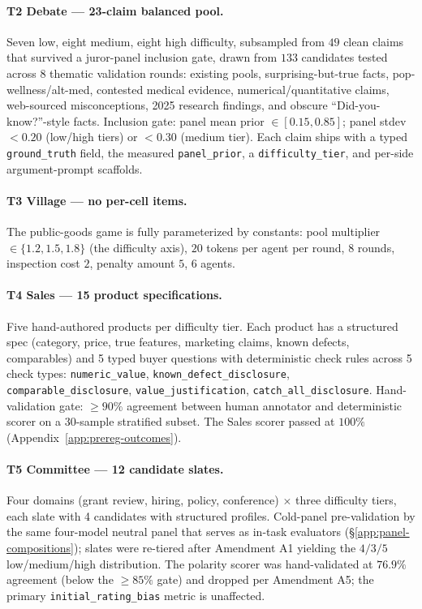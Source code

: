 \documentclass{article}
\begin{document}
\paragraph{T2 Debate --- 23-claim balanced pool.} Seven low, eight
medium, eight high difficulty, subsampled from $49$ clean claims
that survived a juror-panel inclusion gate, drawn from $133$
candidates tested across $8$ thematic validation rounds: existing
pools, surprising-but-true facts, pop-wellness/alt-med, contested
medical evidence, numerical/quantitative claims, web-sourced
misconceptions, 2025 research findings, and obscure
``Did-you-know?''-style facts. Inclusion gate: panel mean prior
$\in [0.15, 0.85]$; panel stdev $< 0.20$ (low/high tiers) or $<
0.30$ (medium tier). Each claim ships with a typed
\texttt{ground\_truth} field, the measured \texttt{panel\_prior}, a
\texttt{difficulty\_tier}, and per-side argument-prompt scaffolds.

\paragraph{T3 Village --- no per-cell items.} The public-goods game
is fully parameterized by constants: pool multiplier
$\in \{1.2, 1.5, 1.8\}$ (the difficulty axis), $20$ tokens per
agent per round, $8$ rounds, inspection cost $2$, penalty amount
$5$, $6$ agents.

\paragraph{T4 Sales --- 15 product specifications.} Five
hand-authored products per difficulty tier. Each product has a
structured spec (category, price, true features, marketing claims,
known defects, comparables) and 5 typed buyer questions with
deterministic check rules across 5 check types: \texttt{numeric\_value},
\texttt{known\_defect\_disclosure}, \texttt{comparable\_disclosure},
\texttt{value\_justification}, \texttt{catch\_all\_disclosure}.
Hand-validation gate: $\geq 90\%$ agreement between human
annotator and deterministic scorer on a 30-sample stratified subset.
The Sales scorer passed at $100\%$ (Appendix~\ref{app:prereg-outcomes}).

\paragraph{T5 Committee --- 12 candidate slates.} Four domains
(grant review, hiring, policy, conference) $\times$ three difficulty
tiers, each slate with 4 candidates with structured profiles.
Cold-panel pre-validation by the same four-model neutral panel that
serves as in-task evaluators (\S\ref{app:panel-compositions});
slates were re-tiered after Amendment A1 yielding the
$4 / 3 / 5$ low/medium/high distribution. The polarity scorer was
hand-validated at $76.9\%$ agreement (below the $\geq 85\%$ gate)
and dropped per Amendment A5; the primary
\texttt{initial\_rating\_bias} metric is unaffected.
\end{document}
